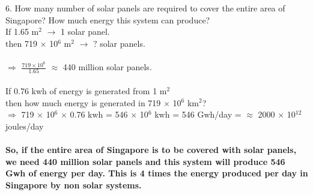 \documentclass[11pt]{exam}
\begin{document}
\begin{questions}
{\begin{minipage}{42em}
                 6. How many number of solar panels are required to cover the entire area of Singapore? How much energy this system can produce? \\
                   If 1.65 m$^{2}$ $\rightarrow$ 1 solar panel. \\
                   then 719 $\times$ 10$^{6}$ m$^{2}$ $\rightarrow$ ? solar panels. \\ \\
                   $\Rightarrow$ $\frac{719 \times 10^{6}}{1.65}$ $\approx$ 440 million solar panels. \\ \\
                   If 0.76 kwh of energy is generated from 1 m$^{2}$  \\
                   then  how much energy is generated in 719 $\times$ 10$^{6}$ km$^{2}$? \\
                   $\Rightarrow$ 719 $\times$ 10$^{6}$ $\times$ 0.76 kwh = 546 $\times$ 10$^{6}$ kwh = 546 Gwh/day = $\approx$ 2000 $\times$ 10$^{12}$ joules/day  \\ \\
                   
                   \textbf{So, if the entire area of Singapore is to be covered with solar panels, we need 440 million solar panels and this system will produce 546 Gwh of energy per day. This is 4 times the energy produced per day in Singapore by non solar systems.}
                   
\end{minipage}} \\ \\                   
                   


\question
\label{Q25:Solar power}


\end{questions}
\end{document}
